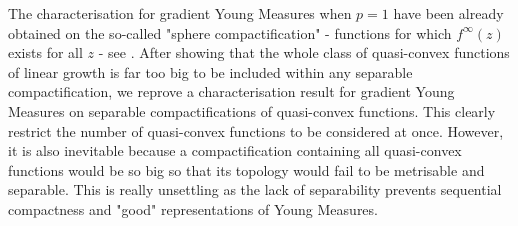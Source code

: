 The characterisation for gradient Young Measures when $p=1$ have been already obtained on the so-called "sphere compactification" - functions for which $f^\infty(z)$ exists for all $z$ - see \cite{kristensen2010characterization,kristensen2010relaxation}.  After showing that the whole class of quasi-convex functions of linear growth is far too big to be included within any separable compactification, we reprove a characterisation result for gradient Young Measures on separable compactifications of quasi-convex functions. This clearly restrict the number of quasi-convex functions to be considered at once. However, it is also inevitable because a compactification containing all quasi-convex functions would be so big so that its topology would fail to be metrisable and separable. This is really unsettling as the lack of separability prevents sequential compactness and "good" representations of Young Measures. \\
